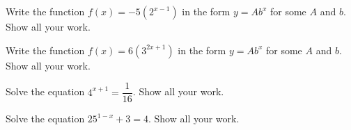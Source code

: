 \documentclass[11pt,letterpaper]{article}
\begin{document}

 Write the function $f(x)= -5(2^{x-1})$ in the form $y= Ab^x$ for some $A$ and $b$. Show all your work. \pspace





\newpage





 Write the function $f(x)= 6(3^{2x+1})$ in the form $y= Ab^x$ for some $A$ and $b$. Show all your work. \pspace





\newpage





 Solve the equation $4^{x+1}= \dfrac{1}{16}$. Show all your work. \pspace





\newpage





 Solve the equation $25^{1-x} + 3= 4$. Show all your work. \pspace


\end{document}
